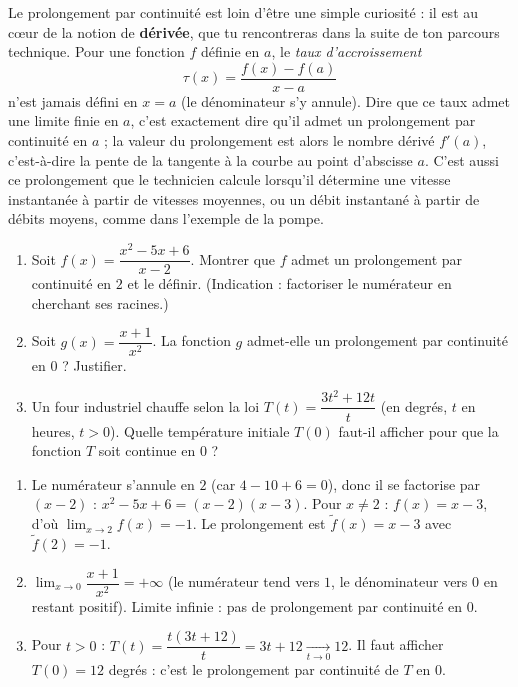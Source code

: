 \documentclass[11pt]{article}
\begin{document}
\begin{savaistu}
Le prolongement par continuité est loin d'être une simple curiosité : il est au cœur de la notion de \textbf{dérivée}, que tu rencontreras dans la suite de ton parcours technique. Pour une fonction $f$ définie en $a$, le \emph{taux d'accroissement}
\[ \tau(x) = \dfrac{f(x) - f(a)}{x - a} \]
n'est jamais défini en $x = a$ (le dénominateur s'y annule). Dire que ce taux admet une limite finie en $a$, c'est exactement dire qu'il admet un prolongement par continuité en $a$ ; la valeur du prolongement est alors le nombre dérivé $f'(a)$, c'est-à-dire la pente de la tangente à la courbe au point d'abscisse $a$. C'est aussi ce prolongement que le technicien calcule lorsqu'il détermine une vitesse instantanée à partir de vitesses moyennes, ou un débit instantané à partir de débits moyens, comme dans l'exemple de la pompe.
\end{savaistu}

\begin{exercice}
\begin{enumerate}
\item Soit $f(x) = \dfrac{x^2 - 5x + 6}{x - 2}$. Montrer que $f$ admet un prolongement par continuité en $2$ et le définir. (Indication : factoriser le numérateur en cherchant ses racines.)
\item Soit $g(x) = \dfrac{x + 1}{x^2}$. La fonction $g$ admet-elle un prolongement par continuité en $0$ ? Justifier.
\item Un four industriel chauffe selon la loi $T(t) = \dfrac{3t^2 + 12t}{t}$ (en degrés, $t$ en heures, $t > 0$). Quelle température initiale $T(0)$ faut-il afficher pour que la fonction $T$ soit continue en $0$ ?
\end{enumerate}
\end{exercice}

\begin{corrige}
\begin{enumerate}
\item Le numérateur s'annule en $2$ (car $4 - 10 + 6 = 0$), donc il se factorise par $(x-2)$ : $x^2 - 5x + 6 = (x-2)(x-3)$. Pour $x \neq 2$ : $f(x) = x - 3$, d'où $\displaystyle\lim_{x \to 2} f(x) = -1$. Le prolongement est $\tilde{f}(x) = x - 3$ avec $\tilde{f}(2) = -1$.
\item $\displaystyle\lim_{x \to 0} \dfrac{x+1}{x^2} = +\infty$ (le numérateur tend vers $1$, le dénominateur vers $0$ en restant positif). Limite infinie : pas de prolongement par continuité en $0$.
\item Pour $t > 0$ : $T(t) = \dfrac{t(3t + 12)}{t} = 3t + 12 \xrightarrow[t \to 0]{} 12$. Il faut afficher $T(0) = 12$ degrés : c'est le prolongement par continuité de $T$ en $0$.
\end{enumerate}
\end{corrige}
\end{document}
